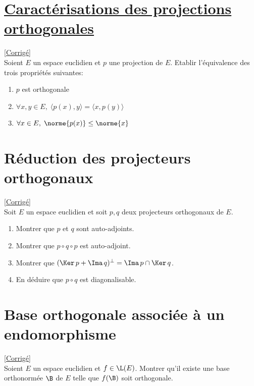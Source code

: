 \documentclass[8pt]{book}
\begin{document}
\section{\underline{Caractérisations des projections orthogonales} }
\label{Caractérisations des projections orthogonales}
\textcolor{blue}{\hyperref[Caractérisations des projections orthogonales corrigé]{[Corrigé]}}\\
Soient $E$ un espace euclidien et $p$ une projection de $E$. Etablir l'équivalence des trois propriétés suivantes:
\begin{enumerate}[label=\roman*.]
	\item $p$ est orthogonale
	\item $\forall x,y \in E, \; \langle p(x),y\rangle=\langle x,p(y)\rangle$
	\item $\forall x \in E, \; \norme{p(x)}\leq \norme{x}$ 
\end{enumerate}

\section{Réduction des projecteurs orthogonaux }
\label{Réduction des projecteurs orthogonaux}
\textcolor{blue}{\hyperref[Réduction des projecteurs orthogonaux corrigé]{[Corrigé]}}\\
Soit $E$ un espace euclidien et soit $p,q$ deux projecteurs orthogonaux de $E$.
\begin{enumerate}
	\item Montrer que $p$ et $q$ sont auto-adjoints.
	\item Montrer que $p\circ q\circ p$ est auto-adjoint.
	\item Montrer que $(\Ker\, p+\Ima\, q)^\bot=\Ima\, p\cap\Ker\, q$.
	\item En déduire que $p\circ q$ est diagonalisable.
\end{enumerate}

\section{Base orthogonale associée à un endomorphisme }
\label{Base orthogonale associée à un endomorphisme}
\textcolor{blue}{\hyperref[Base orthogonale associée à un endomorphisme corrigé]{[Corrigé]}}\\
Soient $E$ un espace euclidien et $f\in \L(E)$. Montrer qu'il existe une base orthonormée $\B$ de $E$ telle que $f(\B)$ soit orthogonale.
\end{document}
